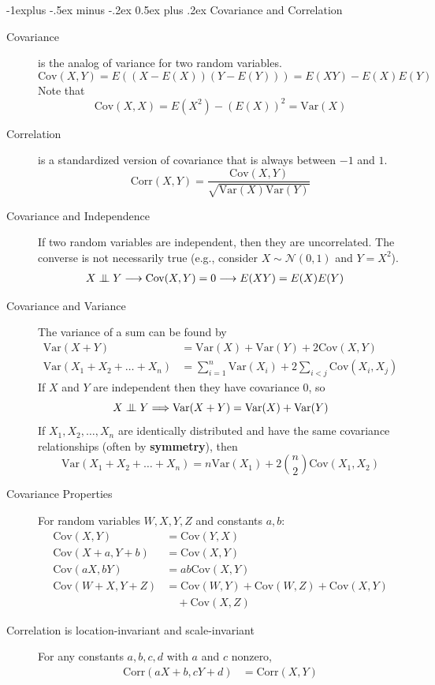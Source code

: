 \documentclass[10pt,landscape]{article}
\makeatletter
\newcommand\independent{\protect\mathpalette{\protect\independenT}{\perp}}
\def\independenT#1#2{\mathrel{\setbox0\hbox{$#1#2$}%
    \copy0\kern-\wd0\mkern4mu\box0}}
\newcommand{\var}{\textrm{Var}}
\newcommand{\cov}{\textrm{Cov}}
\newcommand{\corr}{\textrm{Corr}}
\newcommand{\N}{\mathcal{N}}
\renewcommand{\subsection}{\@startsection{subsection}{2}{0mm}%
                                {-1explus -.5ex minus -.2ex}%
                                {0.5ex plus .2ex}%
                                {\normalfont\normalsize\bfseries}}
\makeatother
\begin{document}
\begin{multicols*}{3}
\subsection{Covariance and Correlation}
\begin{description}
\item [Covariance] is the analog of variance for two random variables.
    \[\cov(X, Y) = E\left((X - E(X))(Y - E(Y))\right) = E(XY) - E(X)E(Y)\]
    Note that 
    \[\cov(X, X) = E(X^2) - (E(X))^2 =  \var(X)\]
\item [Correlation] is a standardized version of covariance that is always between $-1$ and $1$.
    \[\corr(X, Y) = \frac{\cov(X, Y)}{\sqrt{\var(X)\var(Y)}} \]
\item [Covariance and Independence] If two random variables are independent, then they are uncorrelated. The converse is not necessarily true (e.g., consider $X \sim \N(0,1)$ and $Y=X^2$).
    \begin{align*}
    	X \independent Y &\longrightarrow \cov(X, Y) = 0 \longrightarrow E(XY) = E(X)E(Y)
    \end{align*}
\item [Covariance and Variance]  The variance of a sum can be found by
    \begin{align*}
        \var(X + Y) &= \var(X) + \var(Y) + 2\cov(X, Y) \\
        \var(X_1 + X_2 + \dots + X_n ) &= \sum_{i = 1}^{n}\var(X_i) + 2\sum_{i < j} \cov(X_i, X_j)
    \end{align*}
    If $X$ and $Y$ are independent then they have covariance $0$, so
    \[X \independent Y \Longrightarrow \var(X + Y) = \var(X) + \var(Y)\]
    If $X_1, X_2, \dots, X_n$ are identically distributed and have the same covariance relationships (often by \textbf{symmetry}), then 
    \[\var(X_1 + X_2 + \dots + X_n ) = n\var(X_1) + 2{n \choose 2}\cov(X_1, X_2)\]
\item [Covariance Properties]  For random variables $W, X, Y, Z$ and constants $a, b$:
    \begin{align*}
    	\cov(X, Y) &= \cov(Y, X) \\
        \cov(X + a, Y + b) &= \cov(X, Y) \\
        \cov(aX, bY) &= ab\cov(X, Y) \\
        \cov(W + X, Y + Z) &= \cov(W, Y) + \cov(W, Z) + \cov(X, Y)\\
        &\quad + \cov(X, Z)
    \end{align*}
\item [Correlation is location-invariant and scale-invariant] For any constants $a,b,c,d$ with $a$ and $c$ nonzero,
    \begin{align*}
        \corr(aX + b, cY + d) &= \corr(X, Y) 
    \end{align*}
\end{description}


\end{multicols*}
\end{document}
